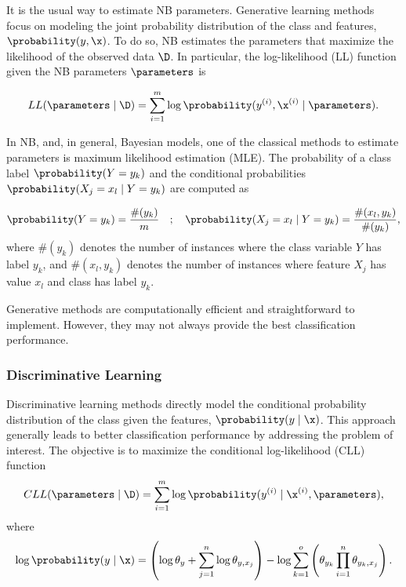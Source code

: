It is the usual way to estimate NB parameters. Generative learning methods \cite{Santaf2007} focus on modeling the joint probability distribution of the class and features, $\probability(y, \x)$. To do so, NB estimates the parameters that maximize the likelihood of the observed data $\D$. In particular, the log-likelihood (LL) function given the NB parameters $\parameters$ is

\begin{equation*}
LL(\parameters \mid \D) = \sum_{i = 1}^{m} \log \probability(y^{(i)}, \x^{(i)} \mid \parameters).
\end{equation*}

In NB, and, in general, Bayesian models, one of the classical methods to estimate parameters is maximum likelihood estimation (MLE). The probability of a class label $\probability(Y = y_k)$ and the conditional probabilities $\probability(X_j = x_l \mid Y = y_k)$ are computed as

\begin{equation*}
\probability(Y = y_k) = \frac{\#(y_k)}{m} \quad ; \quad  \probability(X_j = x_l \mid Y = y_k) = \frac{\#(x_l, y_k)}{\#(y_k)},
\end{equation*} %
%
where $\#(y_k)$ denotes the number of instances where the class variable \(Y\) has label $y_k$, and $\#(x_l, y_k)$ denotes the number of instances where feature \(X_j\) has value \(x_l\) and class has label $y_k$.

Generative methods are computationally efficient and straightforward to implement. However, they may not always provide the best classification performance.


\subsubsection{Discriminative Learning}

Discriminative learning methods \cite{Roos2005,Santaf2007} directly model the conditional probability distribution of the class given the features, $\probability(y \mid \x)$. This approach generally leads to better classification performance by addressing the problem of interest. The objective is to maximize the conditional log-likelihood (CLL) function
%
\begin{equation*}
CLL(\parameters \mid \D) = \sum_{i = 1}^{m} \log \probability(y^{(i)} \mid \x^{(i)}, \parameters),
\end{equation*}
%
where
%
\begin{equation*}
    \log \probability(y \mid \x) =  \left(\log\theta_y + \sum_{j = 1}^{n} \log \theta_{y, x_j}\right) - \log \sum_{k = 1}^{o} \left(\theta_{y_k} \prod_{i = 1}^n \theta_{y_k, x_j}\right).
\end{equation*}

